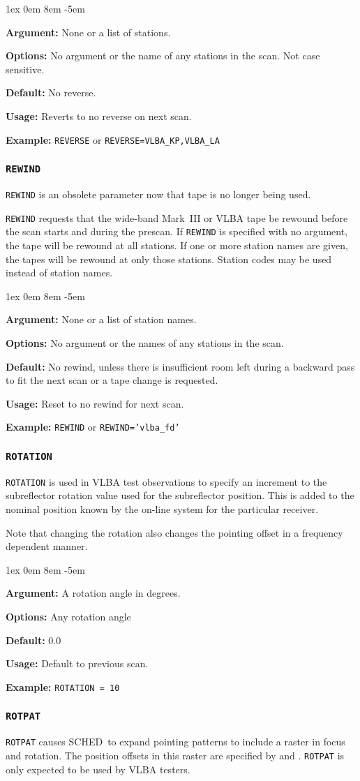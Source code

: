 \documentclass{report}
\newcommand{\schedb}{{\sc SCHED~}}
\newcommand{\rcwbox}[5]{
  \begin{list}{}{\parsep 1ex  \itemsep 0em
                 \leftmargin 8em  \itemindent -5em }
    \item {\bf Argument:} #1
    \item {\bf Options:}  #2
    \item {\bf Default:}  #3
    \item {\bf Usage:}    #4
    \item {\bf Example:}  #5
  \end{list}
}
\begin{document}
\rcwbox
{None or a list of stations.}
{No argument or the name of any stations in the scan. Not case
sensitive.}
{No reverse.}
{Reverts to no reverse on next scan.}
{{\tt REVERSE} or {\tt REVERSE=VLBA\_KP,VLBA\_LA}}


\subsubsection{\label{MP:REWIND}{\tt REWIND}}

{\tt REWIND} is an obsolete parameter now that tape is no longer
being used.

{\tt REWIND} requests that the wide-band Mark~III or VLBA
tape be rewound before the scan starts and during the prescan.  If
{\tt REWIND} is specified with no argument, the tape will be rewound
at all stations. If one or more station names are given, the tapes
will be rewound at only those stations.  Station codes may be used
instead of station names.

\rcwbox
{None or a list of station names.}
{No argument or the names of any stations in the scan.}
{No rewind, unless there is insufficient room left during a backward
pass to fit the next scan or a tape change is requested.}
{Reset to no rewind for next scan.}
{{\tt REWIND} or {\tt REWIND='vlba\_fd'}}


\subsubsection{\label{MP:ROTATION}\tt ROTATION}

{\tt ROTATION} is used in VLBA test observations to specify an
increment to the subreflector rotation value used for the subreflector
position.  This is added to the nominal position known by the on-line
system for the particular receiver.

Note that changing the rotation also changes the pointing offset
in a frequency dependent manner.

\rcwbox
{A rotation angle in degrees.}
{Any rotation angle}
{0.0}
{Default to previous scan.}
{{\tt ROTATION = 10 }}

\subsubsection{\label{MP:ROTPAT}\tt ROTPAT}

{\tt ROTPAT} causes \schedb to expand pointing patterns to include
a raster in focus and rotation.  The position offsets in this
raster are specified by  and
.  {\tt ROTPAT} is only expected
to be used by VLBA testers.
\end{document}
